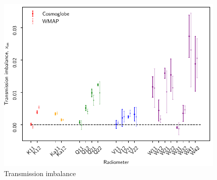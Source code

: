 \documentclass[twocolumn]{../../common/aa}
\begin{document}
\begin{figure}[t]
  	\centering
	\includegraphics[width=\linewidth]{figures/x_im_CG_v1.pdf}
	\caption{Transmission imbalance}
	\label{fig:x_im}
\end{figure}
\end{document}
